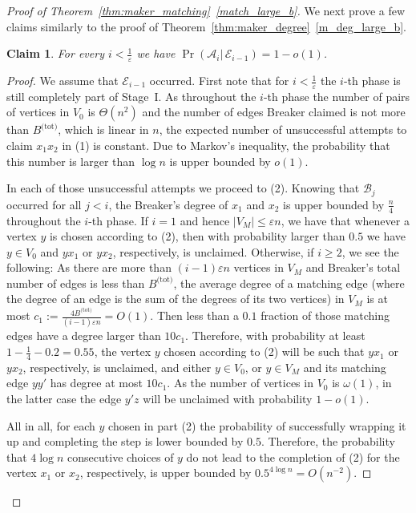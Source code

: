 \documentclass[11pt, a4paper]{article}
\numberwithin{equation}{section}
\numberwithin{figure}{section}
\newtheorem{claim}[theorem]{Claim}
\newcommand{\eps}{\varepsilon}
\begin{document}
\begin{proof}[Proof of Theorem~\ref{thm:maker_matching}~\ref{match_large_b}]
We next prove a few claims similarly to the proof of Theorem~\ref{thm:maker_degree}~\ref{m_deg_large_b}.

\begin{claim} \label{c:prob-ai-pm}
For every $i<\frac{1}{\eps}$ we have $\operatorname{Pr}(\mathcal{A}_i|\, \mathcal{E}_{i-1}) = 1-o(1)$.
\end{claim}

\begin{proof}
We assume that $\mathcal{E}_{i-1}$ occurred. First note that for $i<\frac{1}{\eps}$ the $i$-th phase is still completely part of Stage~I. As throughout the $i$-th phase the number of pairs of vertices in $V_0$ is $\Theta(n^2)$ and the number of edges Breaker claimed is not more than $B^{\text{(tot)}}$, which is linear in $n$, the expected number of unsuccessful attempts to claim $x_1x_2$ in (1) is constant. Due to Markov's inequality, the probability that this number is larger than $\log n$ is upper bounded by $o(1)$.

In each of those unsuccessful attempts we proceed to (2). Knowing that $\mathcal{B}_j$ occurred for all $j<i$, the Breaker's degree of $x_1$ and $x_2$ is upper bounded by $\frac{n}{4}$
throughout the $i$-th phase. 
If $i=1$ and hence $|V_M|\leq \varepsilon n$,
we have that whenever a vertex $y$ 
is chosen according to (2),
then with probability larger than $0.5$ we have $y\in V_0$ and $yx_1$ or $yx_2$, respectively, is unclaimed. Otherwise, if $i\geq 2$, we see the following:
As there are more than $(i-1)\eps n$ vertices in $V_M$ and Breaker's total number of edges is less than $B^{\text{(tot)}}$, the average degree of a matching edge (where the degree of an edge is the sum of the degrees of its two vertices) in $V_M$ is at most $c_1 := \frac{4B^{\text{(tot)}}}{(i-1)\eps n} = O(1)$. Then less than a $0.1$ fraction of those matching edges have a degree larger than $10 c_1$. Therefore, with probability at least $1-\frac{1}{4}-0.2=0.55$, the vertex $y$ chosen according to (2) will be such that $yx_1$ or $yx_2$, respectively, is unclaimed, and either $y\in V_0$, or $y\in V_M$ and its matching edge $yy'$ has degree at most $10 c_1$. As the number of vertices in $V_0$ is $\omega(1)$, in the latter case the edge $y'z$ will be unclaimed with probability $1-o(1)$. 

All in all, for each $y$ chosen in part (2) the probability of successfully wrapping it up and completing the step is lower bounded by $0.5$. Therefore, the probability that $4 \log n$ consecutive choices of $y$ do not lead to the completion of (2) for the vertex $x_1$ or $x_2$, respectively, is upper bounded by $0.5^{4 \log n} = O(n^{-2})$.


\end{proof}
\end{proof}
\end{document}
